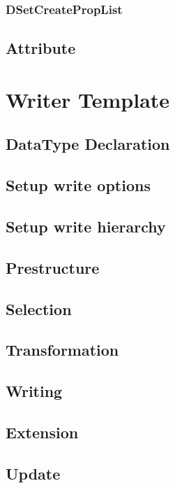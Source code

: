 \subsection{DSetCreatePropList}
\section{Attribute}



\chapter{Writer Template}

\section{DataType Declaration}

\section{Setup write options}

\section{Setup write hierarchy}

\section{Prestructure}

\section{Selection}

\section{Transformation}

\section{Writing}

\section{Extension}

\section{Update}

